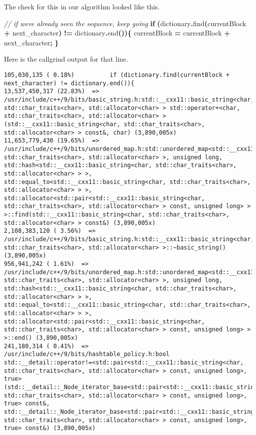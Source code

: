 \documentclass[12pt,twoside]{reedthesis}
\newenvironment{Shaded}{\begin{snugshade}}{\end{snugshade}}
\newcommand{\CommentTok}[1]{\textcolor[rgb]{0.56,0.35,0.01}{\textit{#1}}}
\newcommand{\ControlFlowTok}[1]{\textcolor[rgb]{0.13,0.29,0.53}{\textbf{#1}}}
\newcommand{\NormalTok}[1]{#1}
\newcommand{\OperatorTok}[1]{\textcolor[rgb]{0.81,0.36,0.00}{\textbf{#1}}}
\begin{document}
The check for this in our algorithm looked like this.
\begin{Shaded}
\begin{Highlighting}[]
\CommentTok{// if we\textquotesingle{}ve already seen the sequence, keep going}
\ControlFlowTok{if} \OperatorTok{(}\NormalTok{dictionary}\OperatorTok{.}\NormalTok{find}\OperatorTok{(}\NormalTok{currentBlock }\OperatorTok{+}\NormalTok{ next\_character}\OperatorTok{)} \OperatorTok{!=}\NormalTok{ dictionary}\OperatorTok{.}\NormalTok{end}\OperatorTok{())\{}
\NormalTok{    currentBlock }\OperatorTok{=}\NormalTok{ currentBlock }\OperatorTok{+}\NormalTok{ next\_character}\OperatorTok{;}
\OperatorTok{\}}
\end{Highlighting}
\end{Shaded}
Here is the callgrind output for that line.
\begin{verbatim}
105,030,135 ( 0.18%)          if (dictionary.find(currentBlock + next_character) != dictionary.end()){
13,537,450,317 (22.83%)  => /usr/include/c++/9/bits/basic_string.h:std::__cxx11::basic_string<char, std::char_traits<char>, std::allocator<char> > std::operator+<char, std::char_traits<char>, std::allocator<char> >(std::__cxx11::basic_string<char, std::char_traits<char>, std::allocator<char> > const&, char) (3,890,005x)
11,653,779,430 (19.65%)  => /usr/include/c++/9/bits/unordered_map.h:std::unordered_map<std::__cxx11::basic_string<char, std::char_traits<char>, std::allocator<char> >, unsigned long, std::hash<std::__cxx11::basic_string<char, std::char_traits<char>, std::allocator<char> > >, std::equal_to<std::__cxx11::basic_string<char, std::char_traits<char>, std::allocator<char> > >, std::allocator<std::pair<std::__cxx11::basic_string<char, std::char_traits<char>, std::allocator<char> > const, unsigned long> > >::find(std::__cxx11::basic_string<char, std::char_traits<char>, std::allocator<char> > const&) (3,890,005x)
2,108,383,120 ( 3.56%)  => /usr/include/c++/9/bits/basic_string.h:std::__cxx11::basic_string<char, std::char_traits<char>, std::allocator<char> >::~basic_string() (3,890,005x)
956,941,242 ( 1.61%)  => /usr/include/c++/9/bits/unordered_map.h:std::unordered_map<std::__cxx11::basic_string<char, std::char_traits<char>, std::allocator<char> >, unsigned long, std::hash<std::__cxx11::basic_string<char, std::char_traits<char>, std::allocator<char> > >, std::equal_to<std::__cxx11::basic_string<char, std::char_traits<char>, std::allocator<char> > >, std::allocator<std::pair<std::__cxx11::basic_string<char, std::char_traits<char>, std::allocator<char> > const, unsigned long> > >::end() (3,890,005x)
241,180,314 ( 0.41%)  => /usr/include/c++/9/bits/hashtable_policy.h:bool std::__detail::operator!=<std::pair<std::__cxx11::basic_string<char, std::char_traits<char>, std::allocator<char> > const, unsigned long>, true>(std::__detail::_Node_iterator_base<std::pair<std::__cxx11::basic_string<char, std::char_traits<char>, std::allocator<char> > const, unsigned long>, true> const&, std::__detail::_Node_iterator_base<std::pair<std::__cxx11::basic_string<char, std::char_traits<char>, std::allocator<char> > const, unsigned long>, true> const&) (3,890,005x)
\end{verbatim}
\end{document}
